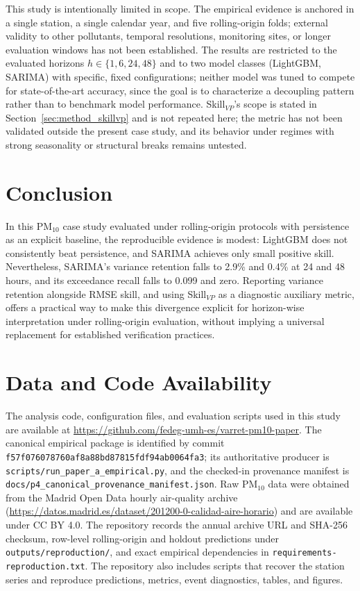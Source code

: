 \documentclass{article}
\begin{document}
This study is intentionally limited in scope.
The empirical evidence is anchored in a single station, a single calendar
year, and five rolling-origin folds; external validity to other pollutants,
temporal resolutions, monitoring sites, or longer evaluation windows has not
been established.
The results are restricted to the evaluated horizons $h\in\{1,6,24,48\}$ and
to two model classes (LightGBM, SARIMA) with specific, fixed configurations;
neither model was tuned to compete for state-of-the-art accuracy, since the
goal is to characterize a decoupling pattern rather than to benchmark model
performance.
Skill$_{VP}$'s scope is stated in Section~\ref{sec:method_skillvp} and is not
repeated here; the metric has not been validated outside the present case
study, and its behavior under regimes with strong seasonality or structural
breaks remains untested.

\section{Conclusion}

In this PM$_{10}$ case study evaluated under rolling-origin protocols with
persistence as an explicit baseline, the reproducible evidence is modest:
LightGBM does not consistently beat persistence, and SARIMA achieves only small
positive skill.  Nevertheless, SARIMA's variance retention falls to 2.9\% and
0.4\% at 24 and 48 hours, and its exceedance recall falls to 0.099 and zero.
Reporting variance retention alongside RMSE skill, and using Skill$_{VP}$ as a
diagnostic auxiliary metric, offers a practical way to make this divergence
explicit for horizon-wise interpretation under rolling-origin evaluation,
without implying a universal replacement for established verification practices.

\section*{Data and Code Availability}

The analysis code, configuration files, and evaluation scripts used in this
study are available at \url{https://github.com/fedeg-umh-es/varret-pm10-paper}.
The canonical empirical package is identified by commit
\texttt{f57f076078760af8a88bd87815fdf94ab0064fa3}; its authoritative producer is
\texttt{scripts/run\_paper\_a\_empirical.py}, and the checked-in provenance
manifest is \texttt{docs/p4\_canonical\_provenance\_manifest.json}.
Raw PM$_{10}$ data were obtained from the Madrid Open Data hourly air-quality
archive (\url{https://datos.madrid.es/dataset/201200-0-calidad-aire-horario})
and are available under CC BY 4.0.  The repository records the annual archive
URL and SHA-256 checksum, row-level rolling-origin and holdout predictions under
\texttt{outputs/reproduction/}, and exact empirical dependencies in
\texttt{requirements-reproduction.txt}.  The repository also includes scripts
that recover the station series and reproduce predictions, metrics, event
diagnostics, tables, and figures.


\begingroup
\small
\setlength{\bibsep}{2pt}

\endgroup
\end{document}
